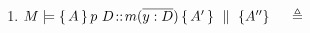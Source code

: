 \begin{definition}
\begin{enumerate}
  \item
 $\satisfies{M} { \mprepostN {A}{p\ D}{m}{y}{D}{A'} {A''} }\  \ \ \   \triangleq $ \\ %
% 
% 


\end{enumerate}
\end{definition}
